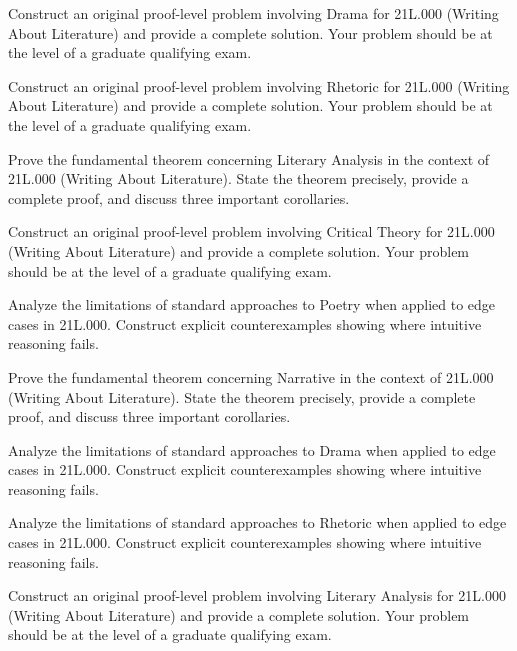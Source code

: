 \documentclass[12pt,a4paper]{exam}
\begin{document}
\begin{questions}
\vspace{0.3cm}

\question[4]
Construct an original proof-level problem involving Drama for 21L.000 (Writing About Literature) and provide a complete solution. Your problem should be at the level of a graduate qualifying exam.

\vspace{0.3cm}

\question[6]
Construct an original proof-level problem involving Rhetoric for 21L.000 (Writing About Literature) and provide a complete solution. Your problem should be at the level of a graduate qualifying exam.

\vspace{0.3cm}

\question[4]
Prove the fundamental theorem concerning Literary Analysis in the context of 21L.000 (Writing About Literature). State the theorem precisely, provide a complete proof, and discuss three important corollaries.

\vspace{0.3cm}

\question[4]
Construct an original proof-level problem involving Critical Theory for 21L.000 (Writing About Literature) and provide a complete solution. Your problem should be at the level of a graduate qualifying exam.

\vspace{0.3cm}

\question[5]
Analyze the limitations of standard approaches to Poetry when applied to edge cases in 21L.000. Construct explicit counterexamples showing where intuitive reasoning fails.

\vspace{0.3cm}

\question[5]
Prove the fundamental theorem concerning Narrative in the context of 21L.000 (Writing About Literature). State the theorem precisely, provide a complete proof, and discuss three important corollaries.

\vspace{0.3cm}

\question[3]
Analyze the limitations of standard approaches to Drama when applied to edge cases in 21L.000. Construct explicit counterexamples showing where intuitive reasoning fails.

\vspace{0.3cm}

\question[5]
Analyze the limitations of standard approaches to Rhetoric when applied to edge cases in 21L.000. Construct explicit counterexamples showing where intuitive reasoning fails.

\vspace{0.3cm}

\question[6]
Construct an original proof-level problem involving Literary Analysis for 21L.000 (Writing About Literature) and provide a complete solution. Your problem should be at the level of a graduate qualifying exam.

\vspace{0.3cm}

\end{questions}
\end{document}
